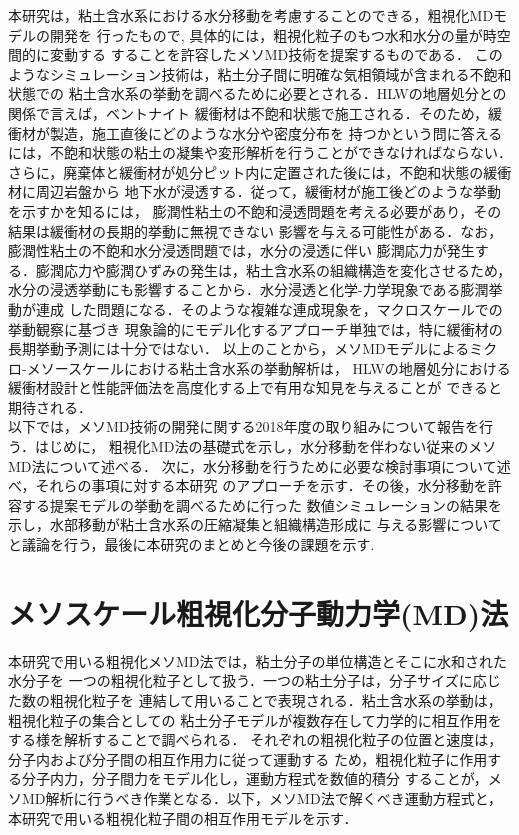 ﻿\documentclass[11pt,a4j]{jarticle}
\begin{document}
本研究は，粘土含水系における水分移動を考慮することのできる，粗視化MDモデルの開発を
行ったもので, 具体的には，粗視化粒子のもつ水和水分の量が時空間的に変動する
することを許容したメソMD技術を提案するものである．
このようなシミュレーション技術は，粘土分子間に明確な気相領域が含まれる不飽和状態での
粘土含水系の挙動を調べるために必要とされる．HLWの地層処分との関係で言えば，ベントナイト
緩衝材は不飽和状態で施工される．そのため，緩衝材が製造，施工直後にどのような水分や密度分布を
持つかという問に答えるには，不飽和状態の粘土の凝集や変形解析を行うことができなければならない．
さらに，廃棄体と緩衝材が処分ピット内に定置された後には，不飽和状態の緩衝材に周辺岩盤から
地下水が浸透する．従って，緩衝材が施工後どのような挙動を示すかを知るには，
膨潤性粘土の不飽和浸透問題を考える必要があり，その結果は緩衝材の長期的挙動に無視できない
影響を与える可能性がある．なお，膨潤性粘土の不飽和水分浸透問題では，水分の浸透に伴い
膨潤応力が発生する．膨潤応力や膨潤ひずみの発生は，粘土含水系の組織構造を変化させるため，
水分の浸透挙動にも影響することから．水分浸透と化学-力学現象である膨潤挙動が連成
した問題になる．そのような複雑な連成現象を，マクロスケールでの挙動観察に基づき
現象論的にモデル化するアプローチ単独では，特に緩衝材の長期挙動予測には十分ではない．
以上のことから，メソMDモデルによるミクロ-メソースケールにおける粘土含水系の挙動解析は，
HLWの地層処分における緩衝材設計と性能評価法を高度化する上で有用な知見を与えることが
できると期待される．\\

以下では，メソMD技術の開発に関する2018年度の取り組みについて報告を行う．はじめに，
粗視化MD法の基礎式を示し，水分移動を伴わない従来のメソMD法について述べる．
次に，水分移動を行うために必要な検討事項について述べ，それらの事項に対する本研究
のアプローチを示す．その後，水分移動を許容する提案モデルの挙動を調べるために行った
数値シミュレーションの結果を示し，水部移動が粘土含水系の圧縮凝集と組織構造形成に
与える影響についてと議論を行う，最後に本研究のまとめと今後の課題を示す. 
\section{メソスケール粗視化分子動力学(MD)法}
本研究で用いる粗視化メソMD法では，粘土分子の単位構造とそこに水和された水分子を
一つの粗視化粒子として扱う．一つの粘土分子は，分子サイズに応じた数の粗視化粒子を
連結して用いることで表現される．粘土含水系の挙動は，粗視化粒子の集合としての
粘土分子モデルが複数存在して力学的に相互作用をする様を解析することで調べられる．
それぞれの粗視化粒子の位置と速度は，分子内および分子間の相互作用力に従って運動する
ため，粗視化粒子に作用する分子内力，分子間力をモデル化し，運動方程式を数値的積分
することが，メソMD解析に行うべき作業となる．以下，メソMD法で解くべき運動方程式と，
本研究で用いる粗視化粒子間の相互作用モデルを示す．\\
\end{document}
